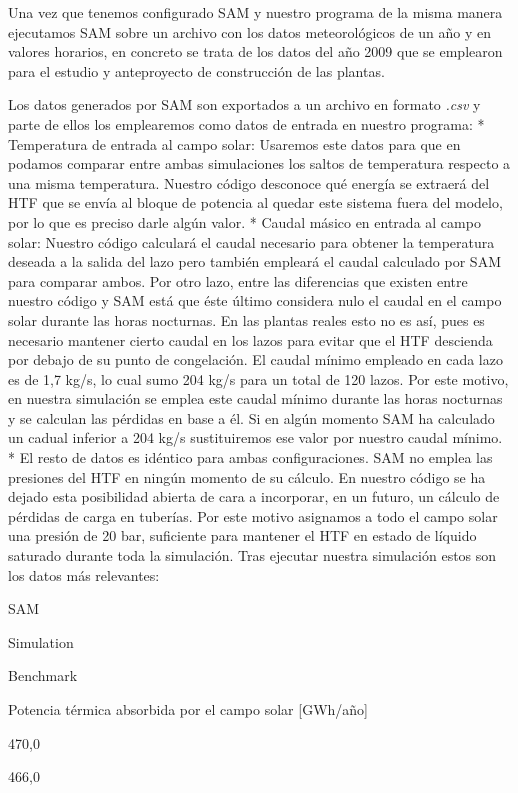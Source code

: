 \documentclass[12pt]{report} %
\begin{document}
Una vez que tenemos configurado SAM y nuestro programa de la misma manera ejecutamos SAM sobre un archivo con los datos meteorológicos de un año y en valores horarios, en concreto se trata de los datos del año 2009 que se emplearon para el estudio y anteproyecto de construcción de las plantas. 

Los datos generados por SAM son exportados a un archivo en formato \emph{.csv} y parte de ellos los emplearemos como datos de entrada en nuestro programa: 
* Temperatura de entrada al campo solar: Usaremos este datos para que en podamos comparar entre ambas simulaciones los saltos de temperatura respecto a una misma temperatura. Nuestro código desconoce qué energía se extraerá del HTF que se envía al bloque de potencia al quedar este sistema fuera del modelo, por lo que es preciso darle algún valor. 
* Caudal másico en entrada al campo solar: Nuestro código calculará el caudal necesario para obtener la temperatura deseada a la salida del lazo pero también empleará el caudal calculado por SAM para comparar ambos. Por otro lazo, entre las diferencias que existen entre nuestro código y SAM está que éste último considera nulo el caudal en el campo solar durante las horas nocturnas. En las plantas reales esto no es así, pues es necesario mantener cierto caudal en los lazos para evitar que el HTF descienda por debajo de su punto de congelación.  El caudal mínimo empleado en cada lazo es de 1,7 kg/s, lo cual sumo 204 kg/s para un total de 120 lazos. Por este motivo, en nuestra simulación se emplea este caudal mínimo durante las horas nocturnas y se calculan las pérdidas en base a él. Si en algún momento SAM ha calculado un cadual inferior a 204 kg/s sustituiremos ese valor por nuestro caudal mínimo. 
* El resto de datos es idéntico para ambas configuraciones. SAM no emplea las presiones del HTF en ningún momento de su cálculo. En nuestro código se ha dejado esta posibilidad abierta de cara a incorporar, en un futuro, un cálculo de pérdidas de carga en tuberías. Por este motivo asignamos a todo el campo solar una presión de 20 bar, suficiente para mantener el HTF en estado de líquido saturado durante toda la simulación. 
Tras ejecutar nuestra simulación estos son los datos más relevantes:

SAM

{Simulation}

{Benchmark}

Potencia térmica absorbida por el campo solar {[}GWh/año{]}

470,0

466,0
\end{document}
